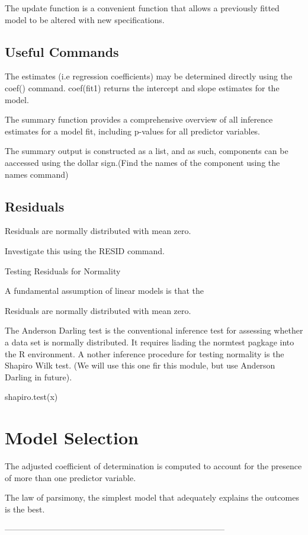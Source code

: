 The update function is a convenient function that allows a previously fitted model to be altered with new specifications.


\subsection{Useful Commands}

The estimates (i.e regression coefficients) may be determined directly using the coef() command. coef(fit1) returns the intercept and slope estimates for the model.


The summary function provides a comprehensive overview of all inference estimates for a model fit, including p-values for all predictor variables.


The summary output is constructed as a list, and as such, components can be aaccessed using the dollar sign.(Find the names of the component using the names command)

\subsection{Residuals}

Residuals are normally distributed with mean zero. 

Investigate this using the RESID command.

Testing Residuals for Normality


A fundamental assumption of linear models is that the

Residuals are normally distributed with mean zero.


The Anderson Darling test is the conventional inference test for assessing whether a data set is normally distributed. It requires liading the normtest pagkage into the R environment. A nother inference procedure for testing normality is the Shapiro Wilk test. (We will use this one fir this module, but use Anderson Darling in future).


shapiro.test(x)


\section{Model Selection}


The adjusted coefficient of determination is computed to account for the presence of more than one predictor variable.


The law of parsimony, the simplest model that adequately explains the outcomes is the best.




--------------------------------------------------------------------------------


